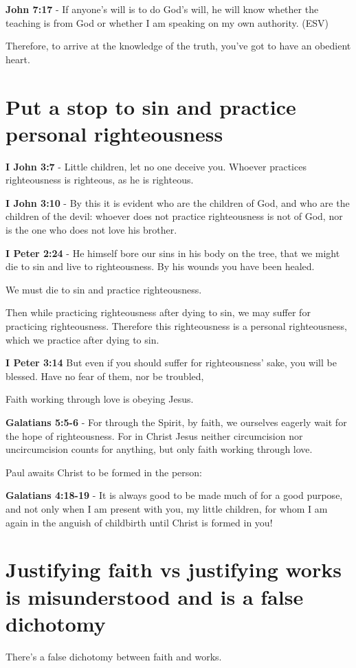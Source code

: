 \documentclass[11pt]{article}
\begin{document}
\textbf{John 7:17} -  If anyone's will is to do God's will, he will know whether the teaching is from God or whether I am speaking on my own authority.  (ESV)

Therefore, to arrive at the knowledge of the truth, you've got to have an obedient heart.

\section{Put a stop to sin and practice personal righteousness}
\label{sec:org4b6900b}
\textbf{I John 3:7} - Little children, let no one deceive you. Whoever practices righteousness is righteous, as he is righteous.

\textbf{I John 3:10} - By this it is evident who are the children of God, and who are the children of the devil: whoever does not practice righteousness is not of God, nor is the one who does not love his brother.

\textbf{I Peter 2:24} - He himself bore our sins in his body on the tree, that we might die to sin and live to righteousness. By his wounds you have been healed.

We must die to sin and practice righteousness.

Then while practicing righteousness after dying to sin, we may suffer for practicing righteousness.
Therefore this righteousness is a personal righteousness, which we practice after dying to sin.

\textbf{I Peter 3:14} But even if you should suffer for righteousness' sake, you will be blessed. Have no fear of them, nor be troubled,

Faith working through love is obeying Jesus.

\textbf{Galatians 5:5-6} - For through the Spirit, by faith, we ourselves eagerly wait for the hope of righteousness. For in Christ Jesus neither circumcision nor uncircumcision counts for anything, but only faith working through love.

Paul awaits Christ to be formed in the person:

\textbf{Galatians 4:18-19} - It is always good to be made much of for a good purpose, and not only when I am present with you, my little children, for whom I am again in the anguish of childbirth until Christ is formed in you!

\section{Justifying faith vs justifying works is misunderstood and is a false dichotomy}
\label{sec:orge27ab0f}
There's a false dichotomy between faith and works.
\end{document}
